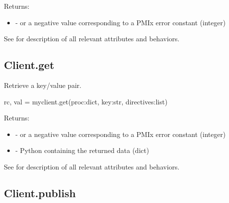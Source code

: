Returns:

\begin{itemize}
    \item {} -  or a negative value corresponding to a PMIx error constant (integer)
\end{itemize}

See  for description of all relevant attributes and behaviors.


\subsection{Client.get}

\summary

Retrieve a key/value pair.

\format

\pyspecificstart
\begin{codepar}
rc, val = myclient.get(proc:dict, key:str, directives:list)
\end{codepar}
\pyspecificend

\begin{arglist}
\end{arglist}

Returns:

\begin{itemize}
    \item {} -  or a negative value corresponding to a PMIx error constant (integer)
    \item {} - Python  containing the returned data (dict)
\end{itemize}

See  for description of all relevant attributes and behaviors.


\subsection{Client.publish}

\summary

